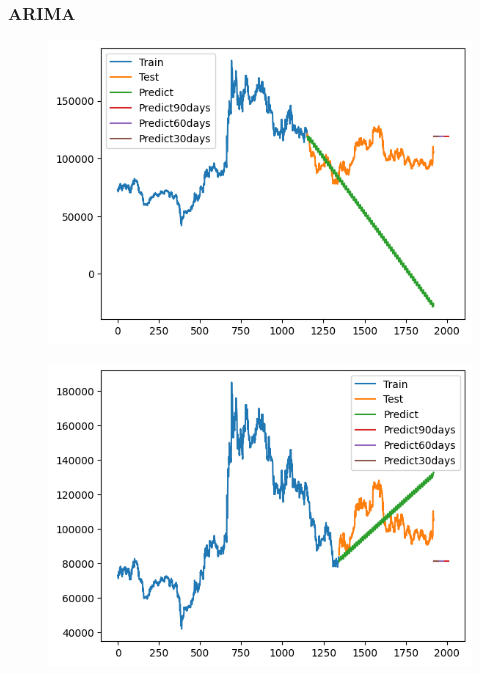 \documentclass[conference]{IEEEtran}
\begin{document}
\subsubsection{ARIMA}
\begin{figure}[H]
    \centering
    \begin{minipage}{0.15\textwidth}
    \centering
    \includegraphics[width=1\textwidth]{Image/ARIMA/LG_6_4_Arima.png}
   
    \label{fig:1}
    \end{minipage}%
    \begin{minipage}{0.15\textwidth}
    \centering
    \includegraphics[width=1\textwidth]{Image/ARIMA/LG_7_3_Arima.png}
  

\end{minipage}
\end{figure}
\end{document}
